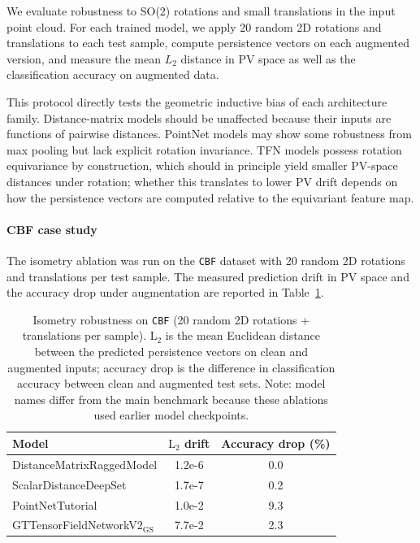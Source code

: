 \documentclass[a4paper,11pt]{article}
\begin{document}
We evaluate robustness to SO(2) rotations and small translations in the input point cloud.
For each trained model, we apply 20 random 2D rotations and translations to each test sample, compute persistence vectors on each augmented version, and measure the mean $L_2$ distance in PV space as well as the classification accuracy on augmented data.

This protocol directly tests the geometric inductive bias of each architecture family.
Distance-matrix models should be unaffected because their inputs are functions of pairwise distances.
PointNet models may show some robustness from max pooling but lack explicit rotation invariance.
TFN models possess rotation equivariance by construction, which should in principle yield smaller PV-space distances under rotation; whether this translates to lower PV drift depends on how the persistence vectors are computed relative to the equivariant feature map.

\paragraph{CBF case study}
The isometry ablation was run on the \texttt{CBF} dataset with 20 random 2D rotations and translations per test sample.
The measured prediction drift in PV space and the accuracy drop under augmentation are reported in Table~\ref{tab:isometry}.
\begin{table}[ht]
\centering
\caption{Isometry robustness on \texttt{CBF} (20 random 2D rotations + translations per sample). $\mathrm{L}_2$ is the mean Euclidean distance between the predicted persistence vectors on clean and augmented inputs; accuracy drop is the difference in classification accuracy between clean and augmented test sets. Note: model names differ from the main benchmark because these ablations used earlier model checkpoints.}
\label{tab:isometry}
\small
\begin{tabular}{lcc}
\toprule
Model & $\mathrm{L}_2$ drift & Accuracy drop (\%) \\
\midrule
DistanceMatrixRaggedModel & 1.2e-6 & 0.0 \\
ScalarDistanceDeepSet & 1.7e-7 & 0.2 \\
PointNetTutorial & 1.0e-2 & 9.3 \\
GTTensorFieldNetworkV2$_\mathrm{GS}$ & 7.7e-2 & 2.3 \\
\bottomrule
\end{tabular}
\end{table}
\end{document}
